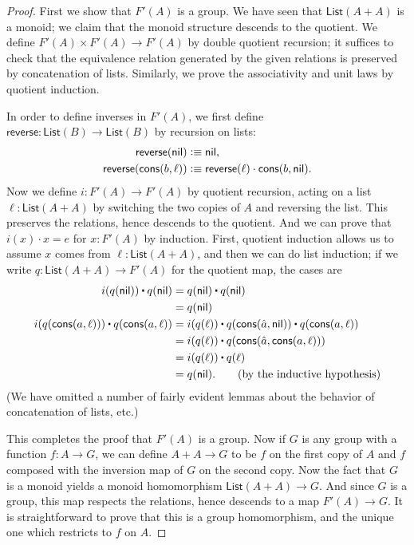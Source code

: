 \documentclass[10pt,a4paper]{article}
\newcommand{\defeq}{\vcentcolon\equiv}  %
\newcommand{\ct}{%
  \mathchoice{\mathbin{\raisebox{0.5ex}{$\displaystyle\centerdot$}}}%
             {\mathbin{\raisebox{0.5ex}{$\centerdot$}}}%
             {\mathbin{\raisebox{0.25ex}{$\scriptstyle\,\centerdot\,$}}}%
             {\mathbin{\raisebox{0.1ex}{$\scriptscriptstyle\,\centerdot\,$}}}
}
\newcommand{\freegroupx}[1]{F'(#1)} %
\newcommand{\lst}[1]{\mathsf{List}(#1)}
\newcommand{\nil}{\mathsf{nil}}
\newcommand{\cons}{\mathsf{cons}}
\theoremstyle{definition}
\theoremstyle{remark}
\numberwithin{equation}{section}
\begin{document}
\begin{proof}
  First we show that $\freegroupx{A}$ is a group.
  We have seen that $\lst{A+A}$ is a monoid; we claim that the monoid structure descends to the quotient.
  We define $\freegroupx{A} \times \freegroupx{A} \to \freegroupx{A}$ by double quotient recursion; it suffices to check that the equivalence relation generated by the given relations is preserved by concatenation of lists.
  Similarly, we prove the associativity and unit laws by quotient induction.

  In order to define inverses in $\freegroupx{A}$, we first define $\mathsf{reverse}:\lst B\to\lst B$ by recursion on lists:
  \begin{align*}
    \mathsf{reverse}(\nil) &\defeq \nil,\\
    \mathsf{reverse}(\cons(b,\ell))&\defeq \mathsf{reverse}(\ell)\cdot \cons(b,\nil).
  \end{align*}
  Now we define $i:\freegroupx{A}\to \freegroupx{A}$ by quotient recursion, acting on a list $\ell:\lst{A+A}$ by switching the two copies of $A$ and reversing the list.
  This preserves the relations, hence descends to the quotient.
  And we can prove that $i(x) \cdot x = e$ for $x:\freegroupx{A}$ by induction.
  First, quotient induction allows us to assume $x$ comes from $\ell:\lst{A+A}$, and then we can do list induction; if we write $q:\lst{A+A}\to \freegroupx{A}$ for the quotient map, the cases are
  \begin{align*}
    i(q(\nil)) \ct q(\nil) &= q(\nil) \ct q(\nil)\\
    &= q(\nil)\\
    i(q(\cons(a,\ell))) \ct q(\cons(a,\ell)) &= i(q(\ell)) \ct q(\cons(\hat{a},\nil)) \ct q(\cons(a,\ell))\\
    &= i(q(\ell)) \ct q(\cons(\hat{a},\cons(a,\ell)))\\
    &= i(q(\ell)) \ct q(\ell)\\
    &= q(\nil). \tag{by the inductive hypothesis}
  \end{align*}
  (We have omitted a number of fairly evident lemmas about the behavior of concatenation of lists, etc.)

  This completes the proof that $\freegroupx{A}$ is a group.
  Now if $G$ is any group with a function $f:A\to G$, we can define $A+A\to G$ to be $f$ on the first copy of $A$ and $f$ composed with the inversion map of $G$ on the second copy.
  Now the fact that $G$ is a monoid yields a monoid homomorphism $\lst{A+A} \to G$.
  And since $G$ is a group, this map respects the relations, hence descends to a map $\freegroupx{A}\to G$.
  It is straightforward to prove that this is a group homomorphism, and the unique one which restricts to $f$ on $A$.
\end{proof}
\end{document}

